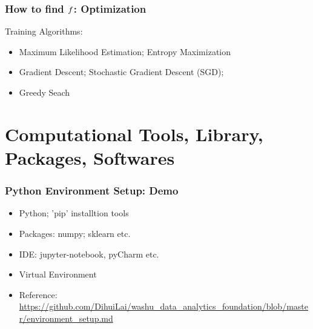 \documentclass[notheorems, aspectratio=54]{beamer}
\begin{document}
\begin{frame}
\frametitle{How to find $\mathnormal{f}$: Optimization}
Training Algorithms:\\
\begin{itemize}
\item Maximum Likelihood Estimation; Entropy Maximization
\item Gradient Descent; Stochastic Gradient Descent (SGD);
\item Greedy Seach
\end{itemize}
\end{frame}


\section{Computational Tools, Library, Packages, Softwares}
\begin{frame}
\frametitle{Python Environment Setup: Demo}
\begin{itemize}
\item Python; 'pip' installtion tools
\item Packages: numpy; sklearn etc.
\item IDE: jupyter-notebook, pyCharm etc.
\item Virtual Environment
\item Reference: \url{https://github.com/DihuiLai/washu_data_analytics_foundation/blob/master/environment_setup.md}

\end{itemize}
\end{frame}
\end{document}
